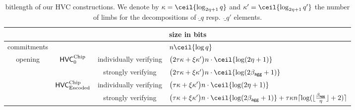 \begin{remark}
\begin{table}\centering
 \begin{tabular}{ccc@{\hskip 3.5ex}l}
  & & & size in bits \\\toprule
  commitments & & & $n\ceil{\log q}$\\
  \hline
  \multirow{4}{*}{opening}& \multirow{2}{*}{$\mathsf{HVC}^{\textup{Chip}}_{0}$} &individually verifying & $\bigl(2\tau\limbs + \xi\limbs'\bigr)n\cdot \ceil{\log(2\eta+1)}$\\\cline{3-4}
                          &                                   &strongly verifying & $\bigl(2\tau\limbs + \xi\limbs'\bigr)n\cdot \ceil{\log(2\bagg+1)}$  \\\cline{2-4}
                          & \multirow{2}{*}{$\mathsf{HVC}_{\textup{Encoded}}^{\textup{Chip}}$}    &individually verifying & $\bigl(\tau\limbs + \xi\limbs'\bigr)n\cdot \ceil{\log(2\eta+1)}$\\\cline{3-4}
                          &                                   &strongly verifying & $\bigl(\tau\limbs + \xi\limbs'\bigr)n\cdot \ceil{\log(2\bagg+1)}+ \tau\limbs n\normalceil{\log (\lfloor\frac{\bagg}{\eta}\rfloor+2)}$\\
                          \hline
 \end{tabular}
 \medskip %
 \caption{bitlength of our HVC constructions. We denote by $\limbs = \ceil{\log_{2\eta+1}q}$ and $\limbs' = \ceil{\log_{2\eta+1}q'}$ the number of limbs for the decompositions of $\ring_q$ resp.\ $\ring_{q'}$ elements.}
 \label{table:hvcsizes}
\end{table}
\end{remark}


